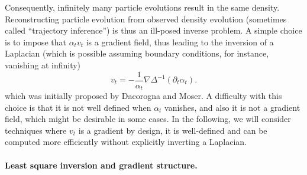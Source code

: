 Consequently, infinitely many particle evolutions result in the same density. Reconstructing particle evolution from observed density evolution (sometimes called ``trajectory inference'') is thus an ill-posed inverse problem.
%
A simple choice is to impose that $\alpha_t v_t$ is a gradient field, thus leading to the inversion of a Laplacian (which is possible assuming boundary conditions, for instance, vanishing at infinity)
\begin{equation}\label{eq:dacorogna-moser}
    v_t = - \frac{1}{\alpha_t} \nabla \Delta^{-1}(\partial_t \alpha_t).
\end{equation}
which was initially proposed by Dacorogna and Moser. A difficulty with this choice is that it is not well defined when $\alpha_t$ vanishes, and also it is not a gradient field, which might be desirable in some cases. In the following, we will consider techniques where $v_t$ is a gradient by design, it is well-defined and can be computed more efficiently without explicitly inverting a Laplacian.  

\paragraph{Least square inversion and gradient structure.}

